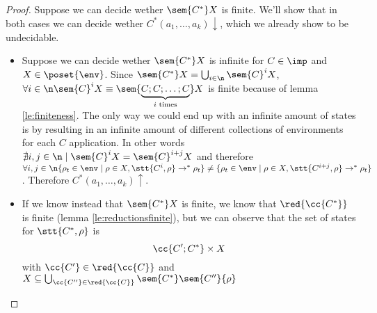 \begin{proof}
  Suppose we can decide wether \(\sem{C^*}X\) is finite. We'll show
  that in both cases we can decide wether \(C^*(a_1, \dots,
  a_k)\downarrow\), which we already show to be undecidable.
  \begin{itemize}
  \item Suppose we can decide wether \(\sem{C^*}X\) is infinite for
    \(C\in\imp\) and \(X\in\poset{\env}\). Since \(\sem{C^*}X =
    \bigcup_{i\in\n}\sem{C}^i X\), \(\forall i \in \n \sem{C}^i X
    \equiv \sem{\underbrace{C;C;\dots;C}_{i\text{ times}}}X\) is
    finite because of lemma \ref{le:finiteness}. The only way we could
    end up with an infinite amount of states is by resulting in an
    infinite amount of different collections of environments for each
    \(C\) application. In other words \(\nexists i,j \in \n \mid
    \sem{C}^i X = \sem{C}^{i+j}X\) and therefore \(\forall i,j\in\n
    \{\rho_t \in \env \mid \rho \in X , \stt{C^i, \rho} \to^* \rho_t\}
    \neq \{\rho_t \in \env \mid \rho \in X , \stt{C^{i+j}, \rho} \to^*
    \rho_t\}\). Therefore \(C^*(a_1, \dots, a_k)\uparrow\).
  \item If we know instead that \(\sem{C^*}X\) is finite, we know that
    \(\red{\cc{C^*}}\) is finite (lemma \ref{le:reductionsfinite}),
    but we can observe that the set of states for \(\stt{C^*, \rho}\)
    is \[\cc{C';C^*} \times X\] with \(\cc{C'}\in\red{\cc{C}}\) and
    \(X \subseteq \bigcup_{\cc{C''}\in\red{\cc{C}}} \sem{C^*}
    \sem{C''} \{\rho\}\)
  \end{itemize}
\end{proof}
